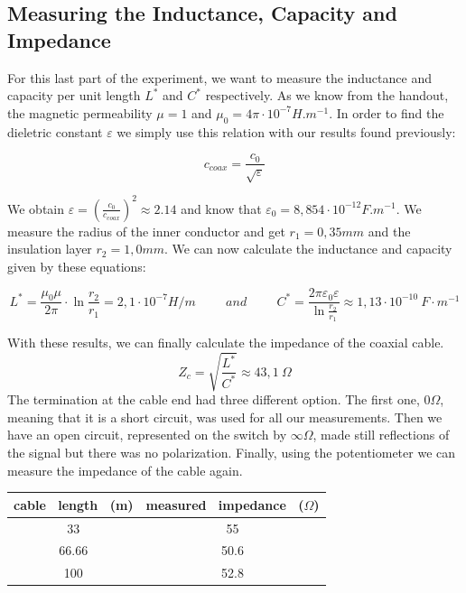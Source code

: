\documentclass{scrartcl}
\begin{document}
\subsection{Measuring the Inductance, Capacity and Impedance}
For this last part of the experiment, we want to measure the inductance and capacity per unit length $L^*$ and $C^*$ respectively. As we know from the handout, the magnetic permeability $\mu=1$ and $\mu_0=4\pi\cdot{10^{-7}}H.m^{-1}$. In order to find the dieletric constant $\varepsilon$ we simply use this relation with our results found previously:

\begin{equation}
    c_{coax}=\frac{c_0}{\sqrt{\varepsilon}} 
\end{equation}

We obtain $\varepsilon= (\frac{c_0}{c_{coax}})^2\approx 2.14$ and know that $\varepsilon_0=8,854\cdot{10^{-12}F.m^{-1}}$.
\newline
We measure the radius of the inner conductor and get $r_1=0,35mm$ and the insulation layer $r_2=1,0mm$.
We can now calculate the inductance and capacity given by these equations:

\begin{equation}
    L^*=\frac{\mu_0\mu}{2\pi}\cdot{\ln\frac{r_2}{r_1}}= 2,1\cdot{10^{-7}}H/m
    \hspace{1cm} and \hspace{1cm}
    C^*=\frac{2\pi\varepsilon_0\varepsilon}{\ln\frac{r_2}{r_1}} \approx 1,13 \cdot{10^{-10}} \ F\cdot m^{-1}
\end{equation}

With these results, we can finally calculate the impedance of the coaxial cable.
\begin{equation}
    Z_c=\sqrt{\frac{L^*}{C^*}} \approx 43,1 \ \Omega
\end{equation}
The termination at the cable end had three different option. The first one, $0\Omega$, meaning that it is a short circuit, was used for all our measurements. Then we have an open circuit, represented on the switch by $\infty \Omega$, made still reflections of the signal but there was no polarization. Finally, using the potentiometer we can measure the impedance of the cable again. 

\centering
\begin{tabular}{|c|c|}
    \hline
    cable \ length \ (m) & measured \ impedance \ ($\Omega$) \\
    \hline
    33 & 55 \\
    \hline
    66.66 & 50.6 \\
    \hline
    100 & 52.8 \\
    \hline
\end{tabular}
\flushleft
\end{document}
